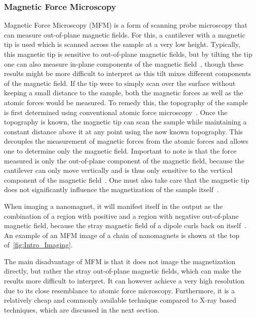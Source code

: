 \documentclass[11pt,a4paper,english,twoside]{article}
\begin{document}
\subsubsection{Magnetic Force Microscopy}
Magnetic Force Microscopy (MFM) is a form of scanning probe microscopy that can measure out-of-plane magnetic fields. For this, a cantilever with a magnetic tip is used which is scanned across the sample at a very low height. Typically, this magnetic tip is sensitive to out-of-plane magnetic fields, but by tilting the tip one can also measure in-plane components of the magnetic field~\cite{MFM_inplane}, though these results might be more difficult to interpret as this tilt mixes different components of the magnetic field. If the tip were to simply scan over the surface without keeping a small distance to the sample, both the magnetic forces as well as the atomic forces would be measured. To remedy this, the topography of the sample is first determined using conventional atomic force microscopy~\cite{NML_Carlton, PEEM}. Once the topography is known, the magnetic tip can scan the sample while maintaining a constant distance above it at any point using the now known topography. This decouples the measurement of magnetic forces from the atomic forces and allows one to determine only the magnetic field. Important to note is that the force measured is only the out-of-plane component of the magnetic field, because the cantilever can only move vertically and is thus only sensitive to the vertical component of the magnetic field~\cite{NML_Carlton}. One must also take care that the magnetic tip does not significantly influence the magnetization of the sample itself~\cite{Probing_MagnetoOptics}. \par
When imaging a nanomagnet, it will manifest itself in the output as the combination of a region with positive and a region with negative out-of-plane magnetic field, because the stray magnetic field of a dipole curls back on itself~\cite{NML_Carlton}. An example of an MFM image of a chain of nanomagnets is shown at the top of~\cref{fig:Intro_Imaging}. \par
The main disadvantage of MFM is that it does not image the magnetization directly, but rather the stray out-of-plane magnetic fields, which can make the results more difficult to interpret. It can however achieve a very high resolution due to its close resemblance to atomic force microscopy. Furthermore, it is a relatively cheap and commonly available technique compared to X-ray based techniques, which are discussed in the next section.
\end{document}
